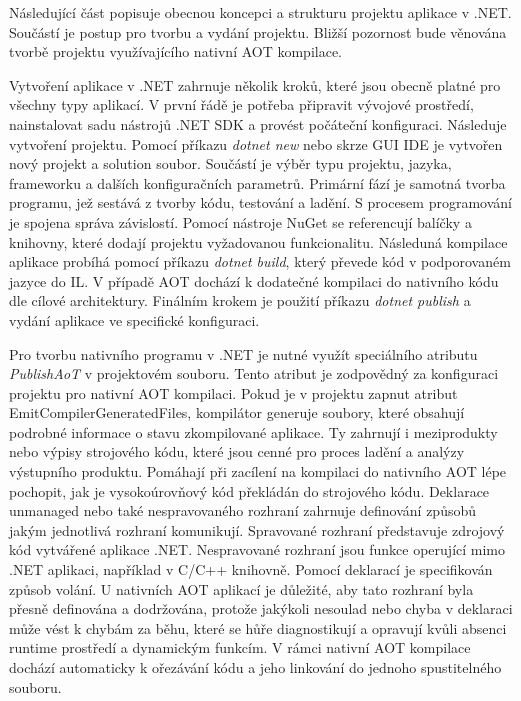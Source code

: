 
Následující část popisuje obecnou koncepci a strukturu projektu aplikace v .NET. Součástí je postup pro tvorbu a vydání projektu. Bližší pozornost bude věnována tvorbě projektu využívajícího nativní AOT kompilace.


Vytvoření aplikace v .NET zahrnuje několik kroků, které jsou obecně platné pro všechny typy aplikací. V první řádě je potřeba připravit vývojové prostředí, nainstalovat sadu nástrojů .NET SDK a provést počáteční konfiguraci. Následuje vytvoření projektu. Pomocí příkazu \emph{dotnet new} nebo skrze GUI IDE je vytvořen nový projekt a solution soubor. Součástí je výběr typu projektu, jazyka, frameworku a dalších konfiguračních parametrů. Primární fází je samotná tvorba programu, jež sestává z tvorby kódu, testování a ladění. \cite{Price2023} S procesem programování je spojena správa závislostí. Pomocí nástroje NuGet se referencují balíčky a knihovny, které dodají projektu vyžadovanou funkcionalitu. Následuná kompilace aplikace probíhá pomocí příkazu \emph{dotnet build}, který převede kód v podporovaném jazyce do IL. V případě AOT dochází k dodatečné kompilaci do nativního kódu dle cílové architektury. Finálním krokem je použití příkazu \emph{dotnet publish} a vydání aplikace ve specifické konfiguraci. 


Pro tvorbu nativního programu v .NET je nutné využít speciálního atributu \emph{PublishAoT} v projektovém souboru. Tento atribut je zodpovědný za konfiguraci projektu pro nativní AOT kompilaci. Pokud je v projektu zapnut atribut EmitCompilerGeneratedFiles, kompilátor generuje soubory, které obsahují podrobné informace o stavu zkompilované aplikace. Ty zahrnují i meziprodukty nebo výpisy strojového kódu, které jsou cenné pro proces ladění a analýzy výstupního produktu. \cite{netdocssg} Pomáhají při zacílení na kompilaci do nativního AOT lépe pochopit, jak je vysokoúrovňový kód překládán do strojového kódu. Deklarace unmanaged nebo také nespravovaného rozhraní zahrnuje definování způsobů jakým jednotlivá rozhraní komunikují. Spravované rozhraní představuje zdrojový kód vytvářené aplikace .NET. Nespravované rozhraní jsou funkce operující mimo .NET aplikaci, například v C/C++ knihovně. \cite{Troelsen2003} Pomocí deklarací je specifikován způsob volání. U nativních AOT aplikací je důležité, aby tato rozhraní byla přesně definována a dodržována, protože jakýkoli nesoulad nebo chyba v deklaraci může vést k chybám za běhu, které se hůře diagnostikují a opravují kvůli absenci runtime prostředí a dynamickým funkcím. V rámci nativní AOT kompilace dochází automaticky k ořezávání kódu a jeho linkování do jednoho spustitelného souboru.

